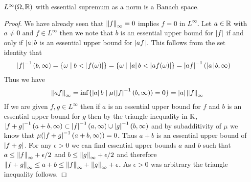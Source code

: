 \begin{thm}$L^\infty(\Omega, \mathbb{R})$ with essential supremum as a norm is a Banach space.
\end{thm}
\begin{proof}
We have already seen that $\left \lVert f \right \rVert_\infty = 0$ implies $f = 0$ in $L^\infty$.  Let $a \in \mathbb{R}$ with $a \neq 0$ and $f \in L^\infty$ then we note that $b$ is an essential upper bound for $\left \vert f \right \vert$ if and only if $\left \vert a \right \vert b$ is an essential upper bound for $\left \vert af \right \vert$.  This follows from the set identity that
\begin{align*}
\left \vert f \right \vert^{-1}(b,\infty) &= \lbrace \omega \mid b < \left \vert f(\omega) \right \vert \rbrace =  \lbrace \omega \mid \left \vert a \right \vert b < \left \vert af(\omega) \right \vert \rbrace = \left \vert af \right \vert^{-1}(\left \vert a \right \vert b, \infty)
\end{align*}
Thus we have 
\begin{align*}
\left \lVert af \right \rVert_\infty = \inf \lbrace \left \vert a \right \vert b \mid \mu(\left \vert f \right \vert^{-1}(b,\infty)) = 0 \rbrace = \left \vert a \right \vert\left \lVert f \right \rVert_\infty
\end{align*}
If we are given $f, g \in L^\infty$ then if $a$ is an essential upper bound for $f$ and $b$ is an essential upper bound for $g$ then by the triangle inequality in $\mathbb{R}$,  $\left \vert f+g \right \vert^{-1}(a+b, \infty) \subset \left \vert f \right \vert^{-1}(a,\infty) \cup \left \vert g \right \vert^{-1}(b,\infty)$ and by subadditivity of $\mu$ we know that $\mu(\left \vert f+g \right \vert^{-1}(a+b, \infty)) = 0$.  Thus $a+b$ is an essential upper bound of $\left \vert f+g \right \vert$.  For any $\epsilon > 0$ we can find essential upper bounds $a$ and $b$ such that $a \leq \left \lVert f \right \rVert_\infty + \epsilon/2$ and $b \leq \left \lVert g \right \rVert_\infty + \epsilon/2$ and therefore $\left \lVert f+g \right \rVert_\infty \leq a + b \leq \left \lVert f \right \rVert_\infty + \left \lVert g \right \rVert_\infty + \epsilon$.  As $\epsilon > 0$ was arbitrary the triangle inequality follows.


\end{proof}
